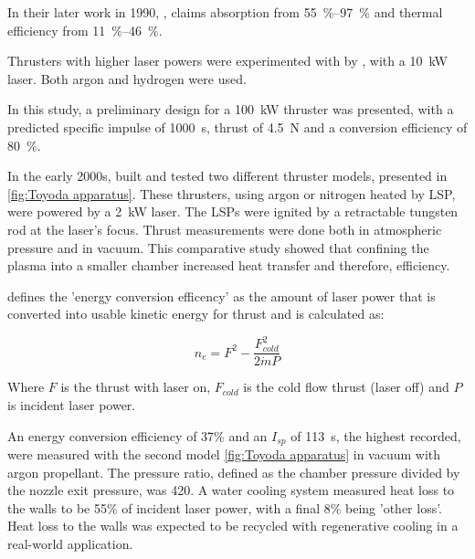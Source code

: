         In their later work in 1990, \textcite{zerkleLasersustainedArgonPlasmas1990}, claims absorption from \qtyrange{55}{97}{\%} and thermal efficiency from \qtyrange{11}{46}{\%}. %


        Thrusters with higher laser powers were experimented with by \textcite{blackLaserPropulsion10kW1995}, with a \qty{10}{kW}  laser. Both argon and hydrogen were used.

        In this study, a preliminary design for a \qty{100}{kW} thruster was presented, with a predicted specific impulse of \qty{1000}{s}, thrust of \qty{4.5}{N} and a conversion efficiency of \qty{80}{\%}.


        In the early 2000s, \textcite{toyodaThrustPerformanceCW2002} built and tested two different thruster models, presented in \autoref{fig:Toyoda apparatus}. These thrusters, using argon or nitrogen heated by LSP, were powered by a \qty{2}{kW}  laser. The LSPs were ignited by a retractable tungsten rod at the laser's focus. Thrust measurements were done both in atmospheric pressure and in vacuum. This comparative study showed that confining the plasma into a smaller chamber increased heat transfer and therefore, efficiency.
        
        \textcite{toyodaThrustPerformanceCW2002} defines the 'energy conversion efficency' as the amount of laser power that is converted into usable kinetic energy for thrust and is calculated as:

        \[ n_e = F^2 - \frac{F^2_{cold}}{2 \dot{m} P}\]

        Where $F$ is the thrust with laser on, $F_{cold}$ is the cold flow thrust (laser off) and $P$ is incident laser power.

        An energy conversion efficiency of 37\% and an $I_{sp}$ of \qty{113}{s}, the highest recorded, were measured with the second model \autoref{fig:Toyoda apparatus} in vacuum with argon propellant. The pressure ratio, defined as the chamber pressure divided by the nozzle exit pressure, was 420. A water cooling system measured heat loss to the walls to be 55\% of incident laser power, with a final 8\% being 'other loss'. Heat loss to the walls was expected to be recycled with regenerative cooling in a real-world application.

